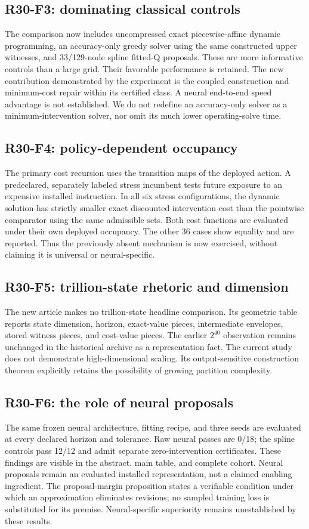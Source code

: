 \subsection{R30-F3: dominating classical controls}
The comparison now includes uncompressed exact piecewise-affine dynamic programming, an accuracy-only greedy solver using the same constructed upper witnesses, and 33/129-node spline fitted-Q proposals. These are more informative controls than a large grid. Their favorable performance is retained. The new contribution demonstrated by the experiment is the coupled construction and minimum-cost repair within its certified class. A neural end-to-end speed advantage is not established. We do not redefine an accuracy-only solver as a minimum-intervention solver, nor omit its much lower operating-solve time.

\subsection{R30-F4: policy-dependent occupancy}
The primary cost recursion uses the transition maps of the deployed action. A predeclared, separately labeled stress incumbent tests future exposure to an expensive installed instruction. In all six stress configurations, the dynamic solution has strictly smaller exact discounted intervention cost than the pointwise comparator using the same admissible sets. Both cost functions are evaluated under their own deployed occupancy. The other 36 cases show equality and are reported. Thus the previously absent mechanism is now exercised, without claiming it is universal or neural-specific.

\subsection{R30-F5: trillion-state rhetoric and dimension}
The new article makes no trillion-state headline comparison. Its geometric table reports state dimension, horizon, exact-value pieces, intermediate envelopes, stored witness pieces, and cost-value pieces. The earlier $2^{40}$ observation remains unchanged in the historical archive as a representation fact. The current study does not demonstrate high-dimensional scaling. Its output-sensitive construction theorem explicitly retains the possibility of growing partition complexity.

\subsection{R30-F6: the role of neural proposals}
The same frozen neural architecture, fitting recipe, and three seeds are evaluated at every declared horizon and tolerance. Raw neural passes are 0/18; the spline controls pass 12/12 and admit separate zero-intervention certificates. These findings are visible in the abstract, main table, and complete cohort. Neural proposals remain an evaluated installed representation, not a claimed enabling ingredient. The proposal-margin proposition states a verifiable condition under which an approximation eliminates revisions; no sampled training loss is substituted for its premise. Neural-specific superiority remains unestablished by these results.

